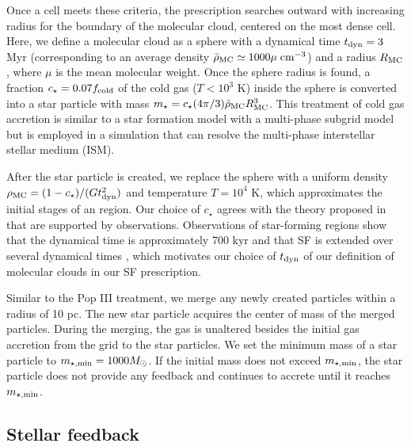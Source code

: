 \documentclass[apj]{emulateapj}
\begin{document}
Once a cell meets these criteria, the prescription searches outward
with increasing radius for the boundary of the molecular cloud,
centered on the most dense cell.  Here, we define a molecular cloud as
a sphere with a dynamical time $t_{\rm dyn} = 3$ Myr (corresponding to
an average density $\bar{\rho}_{\rm MC} \simeq 1000\mu\; \cubecm$) and
a radius $R_{\rm MC}$, where $\mu$ is the mean molecular weight.  Once
the sphere radius is found, a fraction $c_\star = 0.07 f_{\rm cold}$
of the cold gas ($T < 10^3$ K) inside the sphere is converted into a
star particle with mass $m_\star = c_\star (4\pi/3) \bar{\rho}_{\rm
  MC} R_{\rm MC}^3$.  This treatment of cold gas accretion is similar
to a star formation model with a multi-phase subgrid model
\citep{Springel03b} but is employed in a simulation that can resolve
the multi-phase interstellar stellar medium (ISM).

After the star particle is created, we replace the sphere with a
uniform density $\rho_{\rm MC} = (1 - c_\star) / (Gt_{\rm dyn}^2)$ and
temperature $T = 10^4$ K, which approximates the initial stages of an
 region.  Our choice of $c_\star$ agrees with the theory
proposed in \citet{Krumholz05} that are supported by observations.
Observations of star-forming regions show that the dynamical time is
approximately 700 kyr and that SF is extended over several dynamical
times \citep[e.g.][]{Tan06}, which motivates our choice of $t_{\rm
  dyn}$ of our definition of molecular clouds in our SF prescription.

Similar to the Pop III treatment, we merge any newly created particles
within a radius of 10 pc.  The new star particle acquires the center
of mass of the merged particles.  During the merging, the gas is
unaltered besides the initial gas accretion from the grid to the star
particles.  We set the minimum mass of a star particle to $m_{\rm
  \star, min} = 1000 \Ms$.  If the initial mass does not exceed
$m_{\rm \star, min}$, the star particle does not provide any feedback
and continues to accrete until it reaches $m_{\rm \star, min}$.

\subsection{Stellar feedback}
\end{document}

